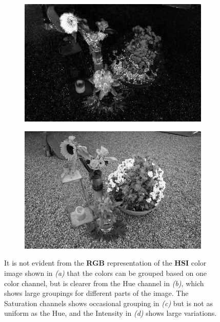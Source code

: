 \begin{figure}[H]
\begin{subfigure}[b]{0.49\textwidth}
		\caption{}
		\label{fig:imgH}
    \end{subfigure}
    \begin{subfigure}[b]{0.49\textwidth}
        \centering
        \includegraphics[width=\textwidth]{./figure/appendix/color_rep/images/imgS.jpg}
		\caption{}
		\label{fig:imgS}
    \end{subfigure}
    \begin{subfigure}[b]{0.49\textwidth}
        \centering
        \includegraphics[width=\textwidth]{./figure/appendix/color_rep/images/imgI.jpg}
		\caption{}
		\label{fig:imgI}
    \end{subfigure}
    \caption{It is not evident from the \textbf{RGB} representation of the \textbf{HSI} color image shown in \textit{(a)} that the colors can be grouped based on one color channel, but is clearer from the Hue channel in \textit{(b)}, which shows large groupings for different parts of the image. The Saturation channels shows occasional grouping in \textit{(c)} but is not as uniform as the Hue, and the Intensity in \textit{(d)} shows large variations.}
    \label{fig:hsiChannels}
\end{figure}

